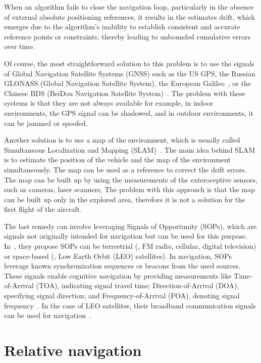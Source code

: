 When an algorithm fails to close the navigation loop, particularly in the absence of external absolute positioning references, it results in the estimates drift, which emerges due to the algorithm's inability to establish consistent and accurate reference points or constraints, thereby leading to unbounded cumulative errors over time.

Of course, the most straightforward solution to this problem is to use the signals of Global Navigation Satellite Systems (GNSS) such as the US GPS, the Russian GLONASS (Global Navigation Satellite System), the European Galileo~\cite{GNSS}, or the Chinese BDS (BeiDou Navigation Satellite System)~\cite{BeiDou}. The problem with these systems is that they are not always available for example, in indoor environments, the GPS signal can be shadowed, and in outdoor environments, it can be jammed or spoofed. 

Another solution is to use a map of the environment, which is usually called Simultaneous Localization and Mapping (SLAM)~\cite{SLAM}. The main idea behind SLAM is to estimate the position of the vehicle and the map of the environment simultaneously. The map can be used as a reference to correct the drift errors. The map can be built up by using the measurements of the exteroceptive sensors, such as cameras, laser scanners, \etc{} The problem with this approach is that the map can be built up only in the explored area, therefore it is not a solution for the first flight of the aircraft. 

The last remedy can involve leveraging Signals of Opportunity (SOPs), which are signals not originally intended for navigation but can be used for this purpose. In~\cite{SOP}, they propose SOPs can be terrestrial (\eg{}, FM radio, cellular, digital television) or space-based (\eg{}, Low Earth Orbit (LEO) satellites). In navigation, SOPs leverage known synchronization sequences or beacons from the used sources. These signals enable cognitive navigation by providing measurements like Time-of-Arrival (TOA), indicating signal travel time; Direction-of-Arrival (DOA), specifying signal direction; and Frequency-of-Arrival (FOA), denoting signal frequency~\cite{SOP-terrestrial}. In the case of LEO satellites, their broadband communication signals can be used for navigation~\cite{SOP-LEO}. 

\section{Relative navigation}

